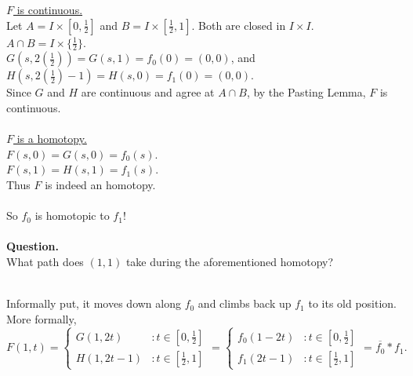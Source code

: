 \documentclass[10pt,reqno]{amsart}
\begin{document}
\noindent\underline {$F$ is continuous.}\\
Let $A = I \times [0, \frac{1}{2}]$ and $B = I \times [\frac{1}{2}, 1]$. Both are closed in $I\times I$.\\
$A \cap B = I \times \{\frac{1}{2}\}$.\\
$G(s, 2(\frac{1}{2})) = G(s, 1) = f_0(0)  = (0,0)$, and\\
$H(s, 2(\frac{1}{2})-1) = H(s, 0) = f_1(0)  = (0,0)$.\\
Since $G$ and $H$ are continuous and agree at $A\cap B$, by the Pasting Lemma, $F$ is continuous.\\\\
\underline {$F$ is a homotopy.}\\
$F(s, 0) = G(s, 0) = f_0(s)$.\\
$F(s, 1) = H(s, 1) = f_1(s)$.\\
Thus $F$ is indeed an homotopy.\\\\
So $f_0$ is homotopic to $f_1$!\\\\
{\bf Question.}\\
What path does $(1, 1)$ take during the aforementioned homotopy?\\
\vspace{1in}

\\
Informally put, it moves down along $f_0$ and climbs back up $f_1$ to its old position.\\
More formally,\\
\begin{displaymath}
   F(1, t) = \left\{
     \begin{array}{lr}
       G(1, 2t) & : t \in [0, \frac{1}{2}]\\
       H(1, 2t-1) & : t \in [\frac{1}{2}, 1]
     \end{array}
   \right.
   = \left\{
     \begin{array}{lr}
      f_0(1-2t) & : t \in [0, \frac{1}{2}]\\
       f_1(2t-1) & : t \in [\frac{1}{2}, 1]
     \end{array}
   \right. 
   =\overline{ f_0} \ast f_1.
\end{displaymath}
\end{document}
